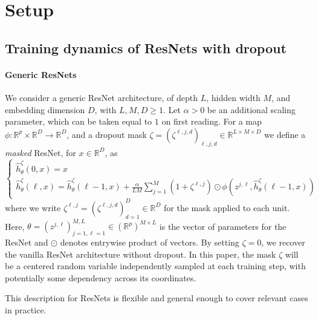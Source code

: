\documentclass[a4paper,11pt]{article}
\newcommand{\R}{\mathbb{R}}
\newcommand{\1}{\mathbbm{1}}
\theoremstyle{definition}
\theoremstyle{remark}
\begin{document}
\section{Setup}\label{sec:setup}
\subsection{Training dynamics of ResNets with dropout}

\paragraph{Generic ResNets}
We consider a generic ResNet architecture, 
of depth $L$, hidden width $M$, and embedding dimension $D$, with $L,M,D\geq 1$. Let $\alpha >0$ be an additional scaling parameter, which can be taken equal to $1$ on first reading.
For a map $\phi: \R^p\times \R^D\to \R^D$, and a dropout mask $\zeta = {(\zeta^{\ell, j, d})}_{\ell,j,d} \in \R^{L\times M\times D}$ 
we define a \emph{masked} ResNet,
for $x\in \R^D$, as
\begin{equation}\label{eq:masked_resnet}
  \begin{cases}
    \hat{h}_\theta^{\zeta}(0, x) = x\\
    \hat{h}_\theta^{\zeta}(\ell, x) = \hat{h}_\theta^{\zeta}(\ell-1, x) + \frac{\alpha}{LM}\sum_{j=1}^M (1+ \zeta^{\ell, j})\odot \phi(z^{j,\ell}, \hat{h}_\theta^{\zeta}(\ell-1, x))
\end{cases}
\end{equation}
where we write $\zeta^{\ell, j} = {(\zeta^{\ell, j,d})}_{d=1}^D\in \R^D$ for the mask applied to each unit.
Here, $\theta = {(z^{j,\ell})}_{j=1,\ell =1}^{M, L} \in {(\R^{p})}^{M\times L}$ is the vector of parameters for the ResNet and $\odot$ denotes entrywise product of vectors. By setting $\zeta = 0$, we recover the vanilla ResNet architecture without dropout. 
In this paper, the mask $\zeta$ will be a centered random variable independently sampled at each training step, with potentially some dependency across its coordinates.

This description for ResNets is flexible and general enough to cover relevant cases in practice.
\end{document}
